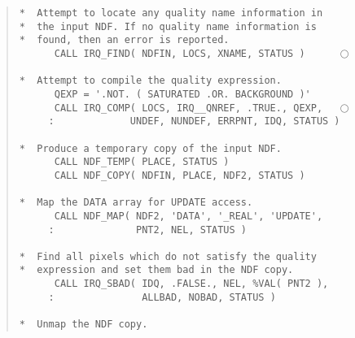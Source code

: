 \documentclass[twoside,11pt]{article}
\newcommand{\htmlref}[2]{#1}
\newcommand{\latexhtml}[2]{#1}
\renewcommand{\_}{\texttt{\symbol{95}}}
\newcommand{\numcir}[1]{\latexhtml{\mbox{\hspace{3ex}$\bigcirc$\hspace{-1.7ex}{\small #1}}}{\htmlref{Note #1}{NOTE#1}}}
\begin{document}
\begin{quote}
\begin{tabbing} 

\verb#*  Attempt to locate any quality name information in   #\\
\verb#*  the input NDF. If no quality name information is    #\\
\verb#*  found, then an error is reported.                   #\\
\verb#      CALL IRQ_FIND( NDFIN, LOCS, XNAME, STATUS )      #\numcir{1}\\
\verb#                                                       #\\
\verb#*  Attempt to compile the quality expression.          #\\
\verb#      QEXP = '.NOT. ( SATURATED .OR. BACKGROUND )'     #\\
\verb#      CALL IRQ_COMP( LOCS, IRQ__QNREF, .TRUE., QEXP,   #\numcir{2}\\
\verb#     :             UNDEF, NUNDEF, ERRPNT, IDQ, STATUS )#\\
\verb#                                                       #\\
\verb#*  Produce a temporary copy of the input NDF.          #\\
\verb#      CALL NDF_TEMP( PLACE, STATUS )                   #\\
\verb#      CALL NDF_COPY( NDFIN, PLACE, NDF2, STATUS )      #\\
\verb#                                                       #\\
\verb#*  Map the DATA array for UPDATE access.               #\\
\verb#      CALL NDF_MAP( NDF2, 'DATA', '_REAL', 'UPDATE',   #\\
\verb#     :              PNT2, NEL, STATUS )                #\\
\verb#                                                       #\\
\verb#*  Find all pixels which do not satisfy the quality    #\\
\verb#*  expression and set them bad in the NDF copy.        #\\
\verb#      CALL IRQ_SBAD( IDQ, .FALSE., NEL, %VAL( PNT2 ),  #\\
\verb#     :               ALLBAD, NOBAD, STATUS )           #\\
\verb#                                                       #\\
\verb#*  Unmap the NDF copy.                                 #\\

\end{tabbing}
\end{quote}
\end{document}
